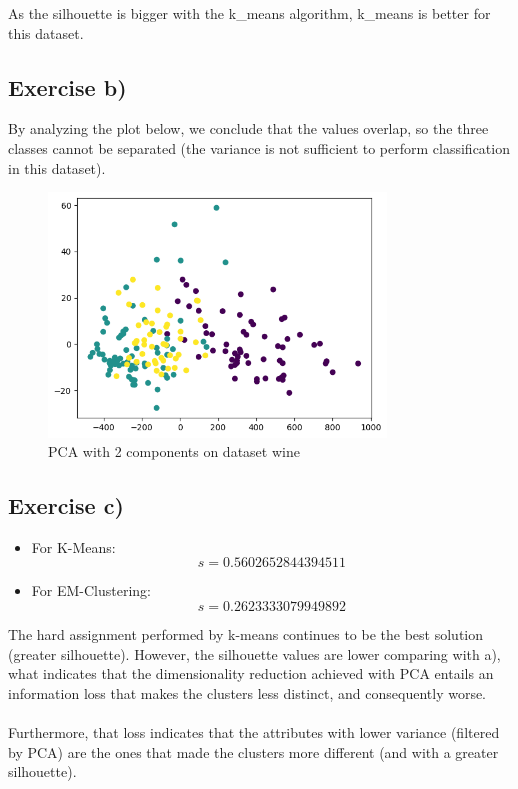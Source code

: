 \documentclass{article}
\begin{document}
As the silhouette is bigger with the k\_means algorithm, k\_means is better for this dataset.

\subsection{Exercise b)}

By analyzing the plot below, we conclude that the values overlap, so the three classes cannot be separated
(the variance is not sufficient to perform classification in this dataset).

\begin{figure}[h]
    \centering
    \includegraphics[width=0.8\textwidth]{output.png}
    \caption{PCA with 2 components on dataset wine}
\end{figure}


\newpage
\subsection{Exercise c)}

\begin{itemize}
    \item For K-Means: 
    \[
    s = 0.5602652844394511
    \]
    
    \item For EM-Clustering: 
    \[
    s = 0.2623333079949892
    \]
\end{itemize}

The hard assignment performed by k-means continues to be the best solution (greater silhouette).
However, the silhouette values are lower comparing with a),
what indicates that the dimensionality reduction achieved with PCA
entails an information loss that makes the clusters less distinct,
and consequently worse.
\\
\\
Furthermore, that loss indicates that the attributes with lower variance 
(filtered by PCA) are the ones that made the clusters more different 
(and with a greater silhouette).
\end{document}
